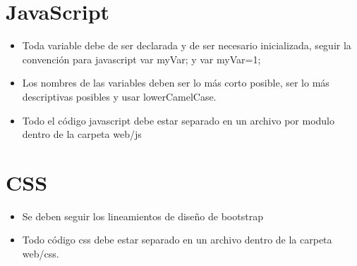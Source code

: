 \section{JavaScript}

\begin{itemize}
\item Toda variable debe de ser declarada y de ser necesario inicializada, seguir la convención para javascript var myVar; y var myVar=1;

\item Los nombres de las variables deben ser lo más corto posible, ser lo más descriptivas posibles y usar lowerCamelCase.

\item Todo el código javascript debe estar separado en un archivo por modulo dentro de la carpeta web/js

\end{itemize}

\section{CSS}
\begin{itemize}
	\item Se deben seguir los lineamientos de diseño de bootstrap

	\item Todo código css debe estar separado en un archivo dentro de la carpeta web/css.

\end{itemize}
